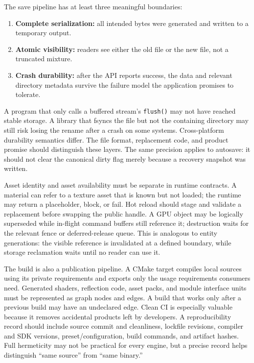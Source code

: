 The save pipeline has at least three meaningful boundaries:

\begin{enumerate}
\def\labelenumi{\arabic{enumi}.}
\tightlist
\item
  \textbf{Complete serialization:} all intended bytes were generated and written to a temporary output.
\item
  \textbf{Atomic visibility:} readers see either the old file or the new file, not a truncated mixture.
\item
  \textbf{Crash durability:} after the API reports success, the data and relevant directory metadata survive the failure model the application promises to tolerate.
\end{enumerate}

A program that only calls a buffered stream's \texttt{flush()} may not have reached stable storage. A library that fsyncs the file but not the containing directory may still risk losing the rename after a crash on some systems. Cross-platform durability semantics differ. The file format, replacement code, and product promise should distinguish these layers. The same precision applies to autosave: it should not clear the canonical dirty flag merely because a recovery snapshot was written.

Asset identity and asset availability must be separate in runtime contracts. A material can refer to a texture asset that is known but not loaded; the runtime may return a placeholder, block, or fail. Hot reload should stage and validate a replacement before swapping the public handle. A GPU object may be logically superseded while in-flight command buffers still reference it; destruction waits for the relevant fence or deferred-release queue. This is analogous to entity generations: the visible reference is invalidated at a defined boundary, while storage reclamation waits until no reader can use it.

The build is also a publication pipeline. A CMake target compiles local sources using its private requirements and exports only the usage requirements consumers need. Generated shaders, reflection code, asset packs, and module interface units must be represented as graph nodes and edges. A build that works only after a previous build may have an undeclared edge. Clean CI is especially valuable because it removes accidental products left by developers. A reproducibility record should include source commit and cleanliness, lockfile revisions, compiler and SDK versions, preset/configuration, build commands, and artifact hashes. Full hermeticity may not be practical for every engine, but a precise record helps distinguish ``same source'' from ``same binary.''

